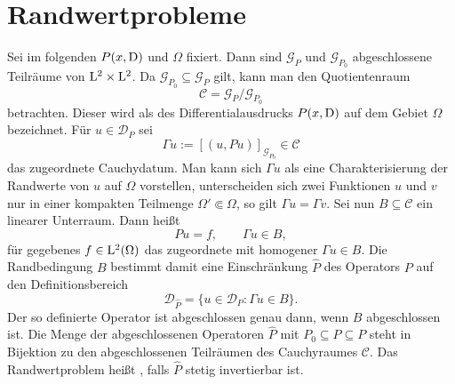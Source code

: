 \section{Randwertprobleme}
Sei im folgenden $P(x,\mathrm D)$ und $\Omega$ fixiert. Dann sind  $\mathcal G_P$ und $\mathcal G_{P_0}$ abgeschlossene Teilräume von $\mathrm L^2\times\mathrm L^2$. Da
$\mathcal G_{P_0}\subseteq \mathcal G_P$ gilt, kann man den Quotientenraum
\begin{equation}
   \mathcal C = \mathcal G_P / \mathcal G_{P_0}
\end{equation}
betrachten. Dieser wird als  des Differentialausdrucks $P(x,\mathrm D)$ auf dem Gebiet $\Omega$ bezeichnet. Für $u\in\mathcal D_P$ sei
\begin{equation}
     \Gamma u := [ (u,Pu) ]_{\mathcal G_{P_0}} \in \mathcal C
\end{equation}
das zugeordnete Cauchydatum. Man kann sich $\Gamma u$ als eine Charakterisierung der Randwerte von $u$ auf $\Omega$ vorstellen, unterscheiden sich zwei Funktionen $u$ und $v$ nur in einer kompakten Teilmenge $\Omega' \Subset \Omega$, so gilt $\Gamma u=\Gamma v$.
Sei nun $B\subseteq\mathcal C$ ein linearer Unterraum. Dann heißt 
\begin{equation}
    Pu = f,\qquad \Gamma u\in B,
\end{equation}
f\"ur gegebenes $f\in\mathrm L^2(\Omega)$ das zugeordnete  mit homogener  $\Gamma u\in B$. Die Randbedingung 
$B$ bestimmt damit eine Einschr\"ankung $\widehat P$ des Operators $P$ auf den Definitionsbereich
\begin{equation}
    \mathcal D_{\widehat P} = \{ u \in \mathcal D_P : \Gamma u\in B \}.
\end{equation}
Der so definierte Operator ist abgeschlossen genau dann, wenn $B$ abgeschlossen ist. Die Menge der abgeschlossenen Operatoren $\widehat P$ mit $P_0\subseteq\widehat P\subseteq P$ steht in Bijektion zu den abgeschlossenen Teilräumen des Cauchyraumes $\mathcal C$.
Das Randwertproblem heißt , falls $\widehat P$ stetig invertierbar ist.

